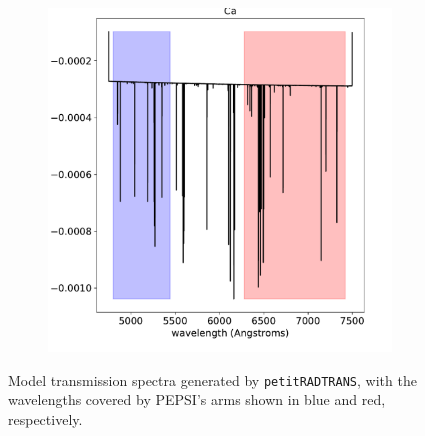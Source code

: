 \documentclass[twocolumn]{aastex631}
\newcommand{\code}[1]{\texttt{#1}}
\begin{document}
\begin{figure}[ht!]
\begin{subfigure}[b]{0.3\textwidth}
                \end{subfigure}
                \begin{subfigure}[b]{0.3\textwidth}\label{fig:Ca-spectrum}
                    \centering
                    \includegraphics[width=\textwidth]{plots/spectra/spectrum.KELT-20b.Ca.2.101e-08.inverted-transmission-better.pdf}
                    
                \end{subfigure}\label{fig:main-spectra}
                \caption{Model transmission spectra generated by \code{petitRADTRANS}, with the wavelengths covered by PEPSI's arms shown in blue and red, respectively.}
                
            \end{figure}
        
\end{document}
